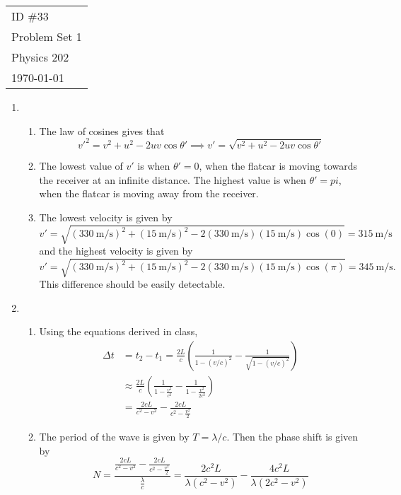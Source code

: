 \documentclass[fleqn]{article}[11pt]
\begin{document}
    \begin{tabular}{l}
        ID \#33 \\
        Problem Set 1 \\
        Physics 202 \\
        \today
    \end{tabular}

\begin{enumerate}
    \item \begin{enumerate}
        \item The law of cosines gives that
        \begin{equation*}
            v'^2 = v^2 + u^2 - 2uv\cos\theta' \implies v' = \sqrt{v^2+u^2-2uv\cos \theta'}
        \end{equation*}

        \item The lowest value of $v'$ is when $\theta'=0$, when the flatcar is moving towards the receiver at an infinite distance. The highest value is when $\theta'=pi$, when the flatcar is moving away from the receiver.

        \item The lowest velocity is given by
        \begin{equation*}
            v' = \sqrt{(\SI{330}{\m/\s})^2+(\SI{15}{\m/\s})^2-2(\SI{330}{\m/\s})(\SI{15}{\m/\s})\cos (0)} = \SI{315}{\m/\s}
        \end{equation*}
        and the highest velocity is given by
        \begin{equation*}
            v' = \sqrt{(\SI{330}{\m/\s})^2+(\SI{15}{\m/\s})^2-2(\SI{330}{\m/\s})(\SI{15}{\m/\s})\cos (\pi)} = \SI{345}{\m/\s}.
        \end{equation*}
        This difference should be easily detectable.
    \end{enumerate}

    \item \begin{enumerate}
        \item Using the equations derived in class,
        \begin{align*}
            \Delta t &= t_2-t_1 = \frac{2L}{c}\left(\frac{1}{1-(v/c)^2} - \frac{1}{\sqrt{1-(v/c)^2}}\right) \\
            &\approx \frac{2L}{c} \left(\frac{1}{1-\frac{v^2}{c^2}} - \frac{1}{1-\frac{v^2}{2c^2}}\right) \\
            &= \frac{2cL}{c^2-v^2} - \frac{2cL}{c^2-\frac{v^2}{2}}
        \end{align*}
        \item \label{phase-shift} The period of the wave is given by $T = \lambda/c$. Then the phase shift is given by
        \begin{equation*}
            N = \frac{\frac{2cL}{c^2-v^2} - \frac{2cL}{c^2-\frac{v^2}{2}}}{\frac{\lambda}{c}} =
            \frac{2 c^2 L}{\lambda \left(c^2-v^2\right)}-\frac{4 c^2 L}{\lambda \left(2 c^2-v^2\right)}
        \end{equation*}


\end{enumerate}
\end{enumerate}
\end{document}
